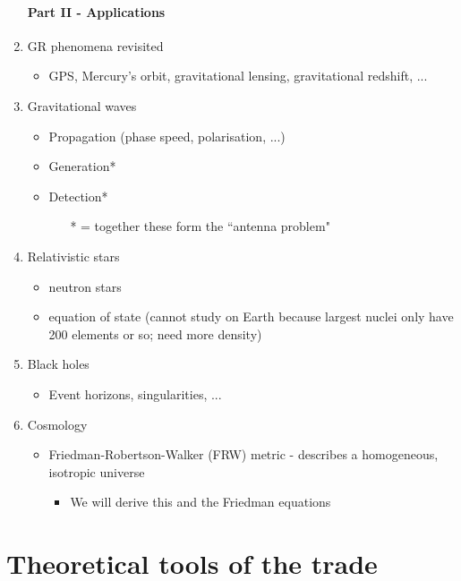 \documentclass[a4paper]{article} %
\begin{document}
\begin{enumerate}
\subsection{Part II - Applications}
\item GR phenomena revisited 
\begin{itemize}
\item GPS, Mercury's orbit, gravitational lensing, gravitational redshift, ...
\end{itemize}
\item Gravitational waves
\begin{itemize}
\item Propagation (phase speed, polarisation, ...)
\item Generation*
\item Detection*
\begin{itemize}
\item[*] = together these form the ``antenna problem"
\end{itemize}
\end{itemize}
\item Relativistic stars
\begin{itemize}
\item neutron stars
\item equation of state (cannot study on Earth because largest nuclei only have 200 elements or so; need more density)
\end{itemize}
\item Black holes
\begin{itemize}
\item Event horizons, singularities, ...
\end{itemize}
\item Cosmology
\begin{itemize}
\item Friedman-Robertson-Walker (FRW) metric - describes a homogeneous, isotropic universe
\begin{itemize}
\item We will derive this and the Friedman equations
\end{itemize}
\end{itemize}

\end{enumerate}

\pagebreak

\part{Theoretical tools of the trade}
\end{document}
